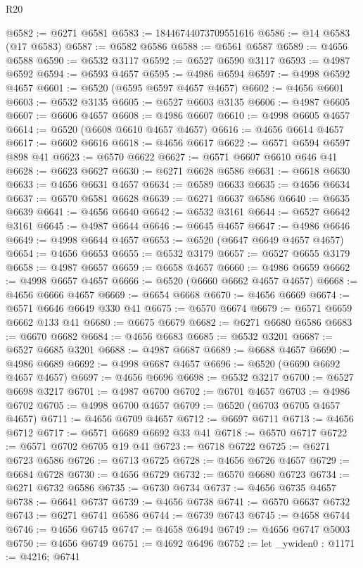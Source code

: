 \begin{lexlean}{R20}
\begin{coremodule}
@6582 := @6271 @6581
@6583 := 18446744073709551616
@6586 := @14 @6583 (@17 @6583)
@6587 := @6582 @6586
@6588 := @6561 @6587
@6589 := @4656 @6588
@6590 := @6532 @3117
@6592 := @6527 @6590 @3117
@6593 := @4987 @6592
@6594 := @6593 @4657
@6595 := @4986 @6594
@6597 := @4998 @6592 @4657
@6601 := @6520 (@6595 @6597 @4657 @4657)
@6602 := @4656 @6601
@6603 := @6532 @3135
@6605 := @6527 @6603 @3135
@6606 := @4987 @6605
@6607 := @6606 @4657
@6608 := @4986 @6607
@6610 := @4998 @6605 @4657
@6614 := @6520 (@6608 @6610 @4657 @4657)
@6616 := @4656 @6614 @4657
@6617 := @6602 @6616
@6618 := @4656 @6617
@6622 := @6571 @6594 @6597 @898 @41
@6623 := @6570 @6622
@6627 := @6571 @6607 @6610 @646 @41
@6628 := @6623 @6627
@6630 := @6271 @6628 @6586
@6631 := @6618 @6630
@6633 := @4656 @6631 @4657
@6634 := @6589 @6633
@6635 := @4656 @6634
@6637 := @6570 @6581 @6628
@6639 := @6271 @6637 @6586
@6640 := @6635 @6639
@6641 := @4656 @6640
@6642 := @6532 @3161
@6644 := @6527 @6642 @3161
@6645 := @4987 @6644
@6646 := @6645 @4657
@6647 := @4986 @6646
@6649 := @4998 @6644 @4657
@6653 := @6520 (@6647 @6649 @4657 @4657)
@6654 := @4656 @6653
@6655 := @6532 @3179
@6657 := @6527 @6655 @3179
@6658 := @4987 @6657
@6659 := @6658 @4657
@6660 := @4986 @6659
@6662 := @4998 @6657 @4657
@6666 := @6520 (@6660 @6662 @4657 @4657)
@6668 := @4656 @6666 @4657
@6669 := @6654 @6668
@6670 := @4656 @6669
@6674 := @6571 @6646 @6649 @330 @41
@6675 := @6570 @6674
@6679 := @6571 @6659 @6662 @133 @41
@6680 := @6675 @6679
@6682 := @6271 @6680 @6586
@6683 := @6670 @6682
@6684 := @4656 @6683
@6685 := @6532 @3201
@6687 := @6527 @6685 @3201
@6688 := @4987 @6687
@6689 := @6688 @4657
@6690 := @4986 @6689
@6692 := @4998 @6687 @4657
@6696 := @6520 (@6690 @6692 @4657 @4657)
@6697 := @4656 @6696
@6698 := @6532 @3217
@6700 := @6527 @6698 @3217
@6701 := @4987 @6700
@6702 := @6701 @4657
@6703 := @4986 @6702
@6705 := @4998 @6700 @4657
@6709 := @6520 (@6703 @6705 @4657 @4657)
@6711 := @4656 @6709 @4657
@6712 := @6697 @6711
@6713 := @4656 @6712
@6717 := @6571 @6689 @6692 @33 @41
@6718 := @6570 @6717
@6722 := @6571 @6702 @6705 @19 @41
@6723 := @6718 @6722
@6725 := @6271 @6723 @6586
@6726 := @6713 @6725
@6728 := @4656 @6726 @4657
@6729 := @6684 @6728
@6730 := @4656 @6729
@6732 := @6570 @6680 @6723
@6734 := @6271 @6732 @6586
@6735 := @6730 @6734
@6737 := @4656 @6735 @4657
@6738 := @6641 @6737
@6739 := @4656 @6738
@6741 := @6570 @6637 @6732
@6743 := @6271 @6741 @6586
@6744 := @6739 @6743
@6745 := @4658 @6744
@6746 := @4656 @6745
@6747 := @4658 @6494
@6749 := @4656 @6747 @5003
@6750 := @4656 @6749
@6751 := @4692 @6496
@6752 := let _ywiden0 : @1171 := @4216; @6741

\end{coremodule}
\end{lexlean}

